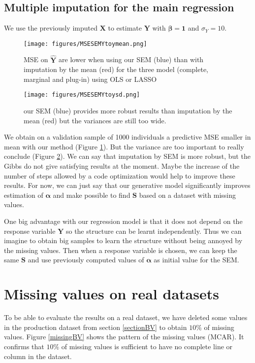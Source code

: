 \documentclass[12pt,a4paper]{report}
\begin{document}
		\subsection{Multiple imputation for the main regression}
		We use the previously imputed $\boldsymbol{X}$ to estimate $\boldsymbol{Y}$ with $\boldsymbol{\beta}=\boldsymbol{1}$ and $\sigma_Y=10$.
			\begin{figure}[h!]
	\centering
	\texttt{[image: figures/MSESEMYtoymean.png]} 
	\caption{MSE on $\hat{\boldsymbol{Y}}$ are lower when using our SEM (blue) than with imputation by the mean (red) for the three model (complete, marginal and plug-in) using OLS or LASSO}\label{MSESEMYtoymean}
\end{figure}	

			\begin{figure}[h!]
	\centering
	\texttt{[image: figures/MSESEMYtoysd.png]} 
	\caption{our SEM (blue) provides more robust results than imputation by the mean (red) but the variances are still too wide.}\label{MSESEMYtoysd}
\end{figure}		
We obtain on a validation sample of 1000 individuals a predictive MSE smaller in mean with our method (Figure \ref{MSESEMYtoymean}). But the variance are too important to really conclude (Figure \ref{MSESEMYtoysd}). We can say that imputation by SEM is more robust, but the Gibbs do not give satisfying results at the moment. Maybe the increase of the number of steps allowed by a code optimization would help to improve these results. For now, we can just say that our generative model significantly improves estimation of $\boldsymbol{\alpha}$ and make possible to find $\boldsymbol{S}$ based on a dataset with missing values.

		One big advantage with our regression model is that it does not depend on the response variable $\boldsymbol{Y}$ so the structure can be learnt independently. Thus we can imagine to obtain big samples to learn the structure without being annoyed by the missing values. Then when a response variable is chosen, we can keep the same $\boldsymbol{S}$ and use previously computed values of $\boldsymbol{\alpha}$ as initial value for the SEM. 

	\section{Missing values on real datasets}	
		To be able to evaluate the results on a real dataset, we have deleted some values in the production dataset from section \ref{sectionBV} to obtain $10\%$ of missing values. Figure \ref{missingBV} shows the pattern of the missing values (MCAR). It confirms that $10\%$ of missing values is sufficient to have no complete line or column in the dataset. 
	
\end{document}
